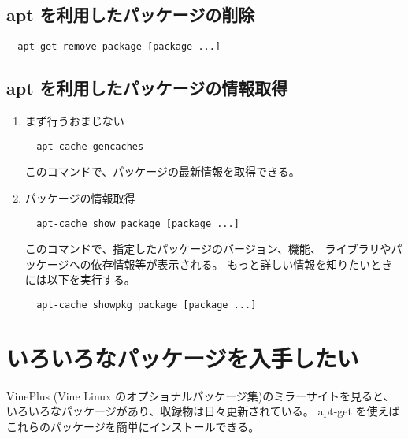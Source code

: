 \documentclass{jreport}
\begin{document}
\subsection{apt を利用したパッケージの削除}

\begin{screen}
\begin{verbatim}
  apt-get remove package [package ...]
\end{verbatim}
\end{screen}


\subsection{apt を利用したパッケージの情報取得}

\begin{enumerate}
\item まず行うおまじない
\begin{screen}
\begin{verbatim}
  apt-cache gencaches
\end{verbatim}
\end{screen}
このコマンドで、パッケージの最新情報を取得できる。
\item パッケージの情報取得
\begin{screen}
\begin{verbatim}
  apt-cache show package [package ...]
\end{verbatim}
\end{screen}
このコマンドで、指定したパッケージのバージョン、機能、
ライブラリやパッケージへの依存情報等が表示される。
もっと詳しい情報を知りたいときには以下を実行する。
\begin{screen}
\begin{verbatim}
  apt-cache showpkg package [package ...]
\end{verbatim}
\end{screen}
\end{enumerate}


\section{いろいろなパッケージを入手したい}

VinePlus (Vine Linux のオプショナルパッケージ集)のミラーサイトを見ると、
いろいろなパッケージがあり、収録物は日々更新されている。
apt-get を使えばこれらのパッケージを簡単にインストールできる。


\end{document}

